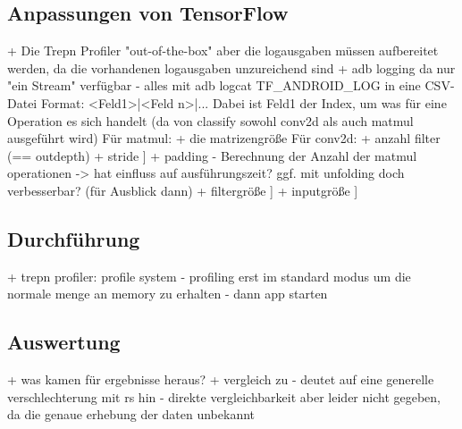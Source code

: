 \subsection{Anpassungen von TensorFlow}
\label{subsec:anpassungentf}
+ Die Trepn Profiler "out-of-the-box" aber die logausgaben müssen aufbereitet werden, da die vorhandenen logausgaben unzureichend sind
+ adb logging
	da nur "ein Stream" verfügbar - alles mit adb logcat TF\_ANDROID\_LOG in eine CSV-Datei
	Format: <Feld1>|<Feld n>|...
	Dabei ist Feld1 der Index, um was für eine Operation es sich handelt (da von classify sowohl conv2d als auch matmul ausgeführt wird)
	Für matmul:
		+ die matrizengröße
	Für conv2d:
		+ anzahl filter (== outdepth)
		+ stride		]
		+ padding		- Berechnung der Anzahl der matmul operationen -> hat einfluss auf ausführungszeit? ggf. mit unfolding doch verbesserbar? (für Ausblick dann)
		+ filtergröße	]
		+ inputgröße	]
		

\subsection{Durchführung}
\label{subsec:experimentdurchfuehrung}
+ trepn profiler: profile system
	- profiling erst im standard modus um die normale menge an memory zu erhalten
	- dann app starten

\subsection{Auswertung}
\label{subsec:experimentauswertung}
+ was kamen für ergebnisse heraus?
+ vergleich zu \cite{rstensorflow2017}
	- deutet auf eine generelle verschlechterung mit rs hin
	- direkte vergleichbarkeit aber leider nicht gegeben, da die genaue erhebung der daten unbekannt
